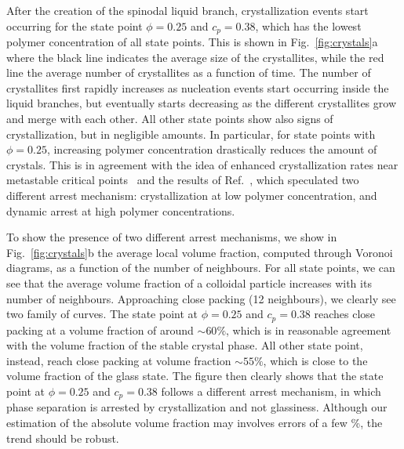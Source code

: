 \documentclass[twocolumn,superscriptaddress,showpacs,preprintnumbers,
amsmath,amssymb,prl]{revtex4-1}
\begin{document}
After the creation of the spinodal liquid branch, crystallization events start occurring for the state point $\phi=0.25$ and $c_p=0.38$, which has the lowest
polymer concentration of all state points. This is shown in Fig.~\ref{fig:crystals}a where the black line indicates the average size of the crystallites,
while the red line the average number of crystallites as a function of time. The number of crystallites first rapidly increases as nucleation events
start occurring inside the liquid branches, but eventually starts decreasing as the different crystallites grow and merge with each other.
All other state points show also signs of crystallization, but in negligible amounts. In particular, for state points with $\phi=0.25$, increasing
polymer concentration drastically reduces the amount of crystals. This is in agreement with the
idea of enhanced crystallization rates near metastable critical points~\cite{ten1997enhancement,olmsted1998spinodal} and the
results of Ref.~\cite{fortini2008crystallization,perez2011pathways},
which speculated two different arrest mechanism: crystallization at low polymer concentration, and dynamic arrest at high polymer concentrations.

To show the presence of two different arrest mechanisms, we show in Fig.~\ref{fig:crystals}b the average local volume fraction, computed
through Voronoi diagrams, as a function of the number of neighbours. For all state points, we can see that the average volume fraction of a colloidal
particle increases with its number of neighbours. Approaching close packing (12 neighbours), we clearly see two family of curves. The state point
at $\phi=0.25$ and $c_p=0.38$ reaches close packing at a volume fraction of around $\sim 60\%$, which is in reasonable agreement with the
volume fraction of the stable crystal phase. All other state point, instead, reach close packing at volume fraction $\sim 55\%$, which is
close to the volume fraction of the glass state. 
The figure then clearly shows that the state point at $\phi=0.25$ and $c_p=0.38$ follows a different arrest mechanism, in which phase separation
is arrested by crystallization and not glassiness. Although our estimation of the absolute volume fraction may involves errors of a few \%, the trend should be robust. 
\end{document}
